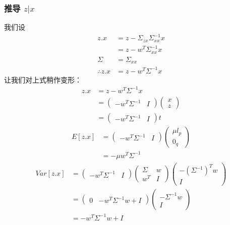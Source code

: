 \documentclass{report}
\begin{document}
\subsubsection{推导 $z|x$}
我们设
\begin{equation}
\begin{aligned}
z.x &= z - \Sigma_{zx} \Sigma_{xx}^{-1} x\\
&= z - w^T \Sigma_{xx}^{-1} x\\
\Sigma &= \Sigma_{xx} \\
\therefore 
z.x &= z - w^T \Sigma^{-1}x
\end{aligned}
\end{equation}
让我们对上式稍作变形：
\begin{equation}
\begin{aligned}
z.x &= z - w^T \Sigma^{-1}x\\
&=
\left (
\begin{matrix}
-w^T \Sigma^{-1} & I
\end{matrix}
\right )
\left (
\begin{matrix}
x\\z
\end{matrix}
\right )\\
&= \left (
\begin{matrix}
-w^T \Sigma^{-1} & I
\end{matrix}
\right )
t
\end{aligned}
\end{equation}
\begin{equation}
\begin{aligned}
E[z.x] &=
\left (
\begin{matrix}
-w^T \Sigma^{-1} & I
\end{matrix}
\right )
\left (
\begin{matrix}
\mu l_p \\ 0_q
\end{matrix}
\right )\\
&= -\mu w^T \Sigma^{-1}
\end{aligned}
\end{equation}
\begin{equation}
\begin{aligned}
Var[z.x] &=
\left (
\begin{matrix}
-w^T \Sigma^{-1} & I
\end{matrix}
\right )
\left (
\begin{matrix}
\Sigma & w\\
w^T & I
\end{matrix}
\right )
\left (
\begin{matrix}
-(\Sigma^{-1})^T w \\ I
\end{matrix}
\right )\\
&= 
\left (
\begin{matrix}
0 & -w^T \Sigma^{-1}w + I
\end{matrix}
\right )
\left (
\begin{matrix}
- \Sigma^{-1} w\\ I
\end{matrix}
\right )\\
&= -w^T \Sigma^{-1}w + I
\end{aligned}
\end{equation}\\
\end{document}
